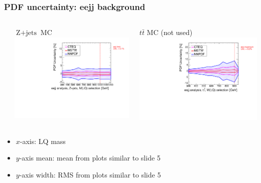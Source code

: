 \documentclass[bigger]{beamer}
\begin{document}
\begin{frame}
\frametitle{PDF uncertainty: eejj background}
\label{sec-3-1-3}
\begin{columns} %
\label{sec-3-1-3-1}
\begin{column}{0.55\textwidth}
\label{sec-3-1-3-1-1}

\centering
$\text{Z}+\text{jets}$ MC
\includegraphics[width=\textwidth]{fig/ZJet_Madgraph_eejj_envelope.pdf}
\end{column}
\begin{column}{0.55\textwidth}
\label{sec-3-1-3-1-2}

\centering
$t\bar{t}$ MC (not used)
\includegraphics[width=\textwidth]{fig/TTbar_Madgraph_eejj_envelope.pdf}
\end{column}
\end{columns}
\label{sec-3-1-3-2}

\centering
\begin{itemize}

\item $x$-axis: LQ mass
\label{sec-3-1-3-2-1}%

\item $y$-axis mean: mean from plots similar to slide 5
\label{sec-3-1-3-2-2}%

\item $y$-axis width: RMS from plots similar to slide 5
\label{sec-3-1-3-2-3}%

\end{itemize} %
\end{frame}
\end{document}

